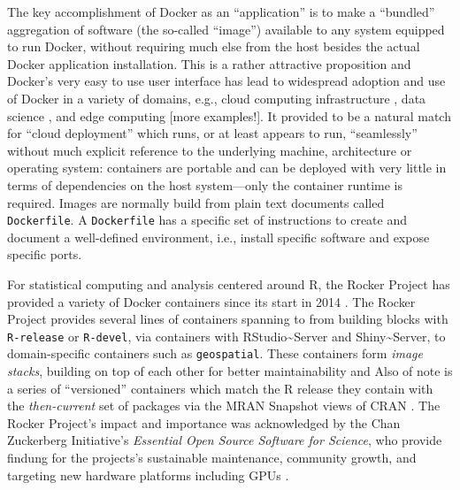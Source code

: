 The key accomplishment of Docker as an ``application'' is to make a
``bundled'' aggregation of software (the so-called ``image'') available
to any system equipped to run Docker, without requiring much else from
the host besides the actual Docker application installation. This is a
rather attractive proposition and Docker's very easy to use user
interface has lead to widespread adoption and use of Docker in a variety
of domains, e.g., cloud computing infrastructure \citep{Bernstein2014},
data science \citep{boettiger_introduction_2015}, and edge computing
\citep{alam_orchestration_2018} {[}more examples!{]}. It provided to be
a natural match for ``cloud deployment'' which runs, or at least appears
to run, ``seamlessly'' without much explicit reference to the underlying
machine, architecture or operating system: containers are portable and
can be deployed with very little in terms of dependencies on the host
system---only the container runtime is required. Images are normally
build from plain text documents called \texttt{Dockerfile}. A
\texttt{Dockerfile} has a specific set of instructions to create and
document a well-defined environment, i.e., install specific software and
expose specific ports.

For statistical computing and analysis centered around R, the Rocker
Project has provided a variety of Docker containers since its start in
2014 \citep{RJ-2017-065}. The Rocker Project provides several lines of
containers spanning to from building blocks with \texttt{R-release} or
\texttt{R-devel}, via containers with RStudio\textasciitilde{}Server and
Shiny\textasciitilde{}Server, to domain-specific containers such as
\texttt{geospatial}. These containers form \emph{image stacks}, building
on top of each other for better maintainability and Also of note is a
series of ``versioned'' containers which match the R release they
contain with the \emph{then-current} set of packages via the MRAN
Snapshot views of CRAN \citep{microsoft_cran_2019}. The Rocker Project's
impact and importance was acknowledged by the Chan Zuckerberg
Initiative's \emph{Essential Open Source Software for Science}, who
provide findung for the projects's sustainable maintenance, community
growth, and targeting new hardware platforms including GPUs
\citep{chan_zuckerberg_initiative_maintaining_2019}.

